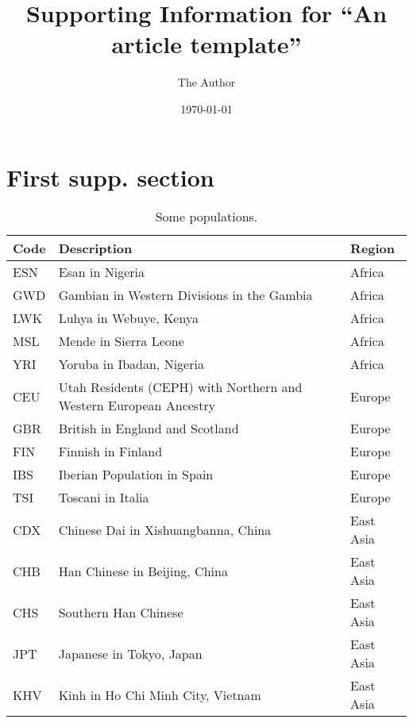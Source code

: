 \documentclass[]{article}
\begin{document}
\title{Supporting Information for ``An article template''}
\author[1,*]{The Author}
\date{\today}
\maketitle

\renewcommand{\thefigure}{S\arabic{figure}}
\renewcommand{\thetable}{S\arabic{table}}
\renewcommand{\theequation}{S\arabic{equation}}
\setcounter{figure}{0}
\setcounter{table}{0}
\setcounter{equation}{0}

\section{First supp. section}


\begin{table}[h]
\caption{\label{tab:1kgpops}Some \citet{10002015global} populations.}
\centering
\begin{tabular}[t]{lll}
\toprule
Code & Description & Region\\
\midrule
ESN & Esan in Nigeria & Africa\\
GWD & Gambian in Western Divisions in the Gambia & Africa\\
LWK & Luhya in Webuye, Kenya & Africa\\
MSL & Mende in Sierra Leone & Africa\\
YRI & Yoruba in Ibadan, Nigeria & Africa\\
\addlinespace
CEU & Utah Residents (CEPH) with Northern and Western European Ancestry & Europe\\
GBR & British in England and Scotland & Europe\\
FIN & Finnish in Finland & Europe\\
IBS & Iberian Population in Spain & Europe\\
TSI & Toscani in Italia & Europe\\
\addlinespace
CDX & Chinese Dai in Xishuangbanna, China & East Asia\\
CHB & Han Chinese in Beijing, China & East Asia\\
CHS & Southern Han Chinese & East Asia\\
JPT & Japanese in Tokyo, Japan & East Asia\\
KHV & Kinh in Ho Chi Minh City, Vietnam & East Asia\\
\bottomrule
\end{tabular}
\end{table}

\break



\end{document}
